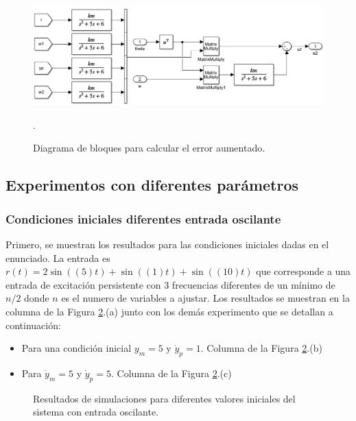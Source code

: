\documentclass[letterpaper,11pt]{article} %
\begin{document}
\begin{figure}
	\centering
	\includegraphics[width=14cm]{error2.png}
	\caption{Diagrama de bloques para calcular el error aumentado.}
	\label{error2}.
\end{figure}

\subsection{Experimentos con diferentes parámetros}
\subsubsection{Condiciones iniciales diferentes entrada oscilante}
Primero, se muestran los resultados para las condiciones iniciales dadas en el enunciado. La entrada es $r(t) = 2\sin((5)t) + \sin((1)t) + \sin( (10)t)$ que corresponde a una entrada de excitación persistente con 3 frecuencias diferentes de un mínimo de $n/2$ donde $n$ es el numero de variables a ajustar. Los resultados se muestran en la columna de la Figura \ref{inicialrs}.(a) junto con los demás experimento que se detallan a continuación:
\begin{itemize}
	\item Para una condición inicial $y_m = 5$ y $\dot{y}_p = 1$. Columna de la Figura \ref{inicialrs}.(b)
	\item Para $\dot{y}_m = 5$ y $\dot{y}_p = 5$. Columna de la Figura \ref{inicialrs}.(c)
\end{itemize}

\newpage
\begin{figure}[h]
	\centering
	\captionsetup{justification=centering}
	\newline
	\noindent
	\newline
	\noindent
	\addtocounter{figure}{-1}  
	\caption{Resultados de simulaciones para diferentes valores iniciales del sistema con entrada oscilante.}
	\label{inicialrs}
\end{figure}
\end{document}
